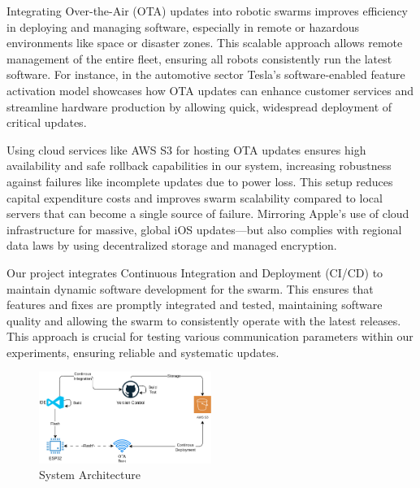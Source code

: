 \documentclass{report}
\begin{document}
Integrating Over-the-Air (OTA) updates into robotic swarms improves efficiency in deploying and managing software, especially in remote or hazardous environments like space or disaster zones. This scalable approach allows remote management of the entire fleet, ensuring all robots consistently run the latest software. For instance, in the automotive sector Tesla's software-enabled feature activation model showcases how OTA updates can enhance customer services and streamline hardware production by allowing quick, widespread deployment of critical updates.

Using cloud services like AWS S3 for hosting OTA updates ensures high availability and safe rollback capabilities in our system, increasing robustness against failures like incomplete updates due to power loss. This setup reduces capital expenditure costs and improves swarm scalability compared to local servers that can become a single source of failure. Mirroring Apple’s use of cloud infrastructure for massive, global iOS updates—but also complies with regional data laws by using decentralized storage and managed encryption.

Our project integrates Continuous Integration and Deployment (CI/CD) to maintain dynamic software development for the swarm. This ensures that features and fixes are promptly integrated and tested, maintaining software quality and allowing the swarm to consistently operate with the latest releases. This approach is crucial for testing various communication parameters within our experiments, ensuring reliable and systematic updates.

\begin{figure}[h]
    \centering
    \includegraphics[width=0.5\textwidth]{architecture.png}
    \caption{System Architecture}
    \label{fig:architecture}
\end{figure}
\end{document}
